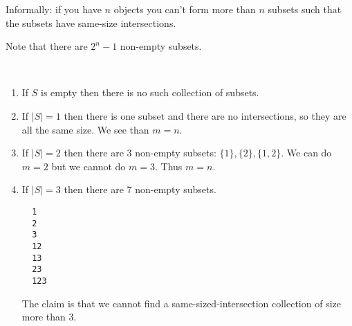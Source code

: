 Informally: if you have $n$ objects you can't form more than $n$ subsets such that the subsets have
same-size intersections.

Note that there are $2^n - 1$ non-empty subsets.

\begin{example*}~\\
  \begin{enumerate}
  \item If $S$ is empty then there is no such collection of subsets.
  \item If $|S| = 1$ then there is one subset and there are no intersections, so they are all the same
    size. We see than $m = n$.
  \item If $|S| = 2$ then there are 3 non-empty subsets: $\{1\}, \{2\}, \{1, 2\}$. We can do $m=2$
    but we cannot do $m=3$. Thus $m = n$.
  \item If $|S| = 3$ then there are 7 non-empty subsets.
\begin{verbatim}
  1
  2
  3
  12
  13
  23
  123
  \end{verbatim}
    The claim is that we cannot find a same-sized-intersection collection of size more than 3.
  \end{enumerate}
\end{example*}


\begin{comment}  %

\end{comment}  %
